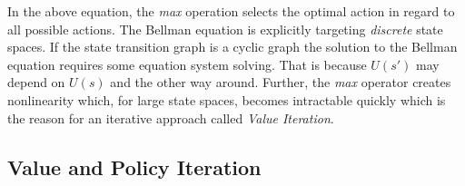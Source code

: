 In the above equation, the \emph{max} operation selects the optimal action in regard to all possible actions. The
Bellman equation is explicitly targeting \emph{discrete} state spaces. If the state transition graph is a cyclic graph
the solution to the Bellman equation requires some equation system solving. That is because $U(s')$ may depend on $U(s)$
and the other way around. Further, the \emph{max} operator creates nonlinearity which, for large state spaces, becomes
intractable quickly which is the reason for an iterative approach called \emph{Value Iteration}.







\subsection{Value and Policy Iteration}%
\label{sub:policy_and_value_iteration}

